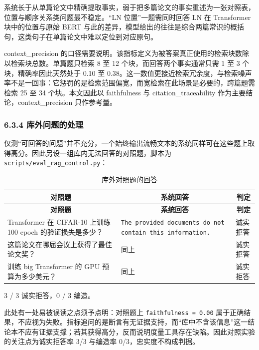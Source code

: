 \documentclass[UTF8,fontset=windows,zihao=5,a4paper]{ctexart}
\begin{document}
系统长于从单篇论文中精确提取事实，弱于把多篇论文的事实重述为一张对照表，位置与顺序关系类问题最不稳定。“LN 位置”一题需同时回答 LN 在 Transformer 块中的位置与原始 BERT 与此的差异，模型给出的往往是综合两篇常识的概括句，这类句子在单篇论文中难以定位到对应原句。

context\_\allowbreak{}precision 的口径需要说明。该指标定义为被答案真正使用的检索块数除以检索块总数。单篇题只检索 8 至 12 个块，而回答两个事实通常只需 1 至 3 个块，精确率因此天然处于 0.10 至 0.38。这一数值更接近检索冗余度，与检索噪声率不是一回事：它惩罚的是检索范围偏宽，而宽检索在此场景是必要的，跨篇题需检索 25 至 34 个块。本文因此以 faithfulness 与 citation\_\allowbreak{}traceability 作为主要结论，context\_\allowbreak{}precision 只作参考量。

\subsubsection*{6.3.4 库外问题的处理}
仅测“可回答的问题”并不充分，一个始终输出流畅文本的系统同样可在这些题上取得高分。因此另设一组库内无法回答的对照题，脚本为 \texttt{scripts/eval\_\allowbreak{}rag\_\allowbreak{}control.py}：

\begin{longtable}{@{}p{}p{}p{}@{}}
\caption{库外对照题的回答}\\
\toprule
\multicolumn{1}{c}{\textbf{对照题}} & \multicolumn{1}{c}{\textbf{系统回答}} & \multicolumn{1}{c}{\textbf{判定}} \\
\midrule
\endfirsthead
\toprule
\multicolumn{1}{c}{\textbf{对照题}} & \multicolumn{1}{c}{\textbf{系统回答}} & \multicolumn{1}{c}{\textbf{判定}} \\
\midrule
\endhead
\bottomrule
\endfoot
Transformer 在 CIFAR-10 上训练 100 epoch 的验证损失是多少？ & \texttt{The provided documents do not contain this information.} & 诚实拒答 \\
这篇论文在哪届会议上获得了最佳论文奖？ & 同上 & 诚实拒答 \\
训练 big Transformer 的 GPU 预算为多少美元？ & 同上 & 诚实拒答 \\
\end{longtable}

3 / 3 诚实拒答，0 / 3 编造。

此处有一处易被误读之点须予点明：对照题上 \texttt{faithfulness = 0.00} 属于正确结果，不应视为失败。指标追问的是断言有无证据支持，而“库中不含该信息”这一结论本不应有证据支撑；若其获得高分，反而说明度量工具存在缺陷。因此对照实验的关注点为诚实拒答率 3/3 与编造率 0/3，忠实度不构成判据。
\end{document}
